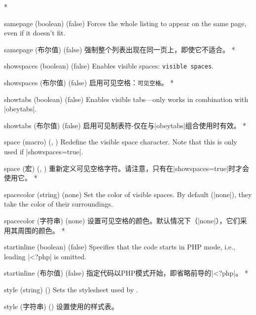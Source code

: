 \begin{optionlist}
\begin{paracol}{2}
\switchcolumn[0]*%
  \item[samepage (boolean) (false)]
    Forces the whole listing to appear on the same page, even if it doesn't fit.
    \switchcolumn
    \item[samepage (布尔值) (false)]
    强制整个列表出现在同一页上，即使它不适合。
\switchcolumn[0]*%
  \item[showspaces (boolean) (false)]
    Enables visible spaces: \verb*/visible spaces/.
    \switchcolumn
    \item[showspaces (布尔值) (false)]
    启用可见空格：\verb*/可见空格/。
\switchcolumn[0]*%
  \item[showtabs (boolean) (false)]
    Enables visible tabs---only works in combination with |obeytabs|.
    \switchcolumn
    \item[showtabs (布尔值) (false)]
    启用可见制表符-仅在与|obeytabs|组合使用时有效。
    \switchcolumn[0]*%

\item[space (macro) (\string\textvisiblespace, \textvisiblespace)]
Redefine the visible space character.  Note that this is only used if |showspaces=true|.
\switchcolumn
\item[space (宏) (\string\textvisiblespace, \textvisiblespace)]
重新定义可见空格字符。请注意，只有在|showspaces=true|时才会使用它。
\switchcolumn[0]*%

\item[spacecolor (string) (none)]
Set the color of visible spaces.  By default (|none|), they take the color of their surroundings.
\switchcolumn
\item[spacecolor (字符串) (none)]
设置可见空格的颜色。默认情况下（|none|），它们采用其周围的颜色。
\switchcolumn[0]*%

  \item[startinline (boolean) (false)] 
    Specifies that the code starts in PHP mode, i.e., leading |<?php| is omitted.
    \switchcolumn
    \item[startinline (布尔值) (false)] 
    指定代码以PHP模式开始，即省略前导的|<?php|。
\switchcolumn[0]*%
  \item[style] (string) ()
    Sets the stylesheet used by .
    \switchcolumn
    \item[style] (字符串) ()
    设置使用的样式表。



\end{paracol}
\end{optionlist}
